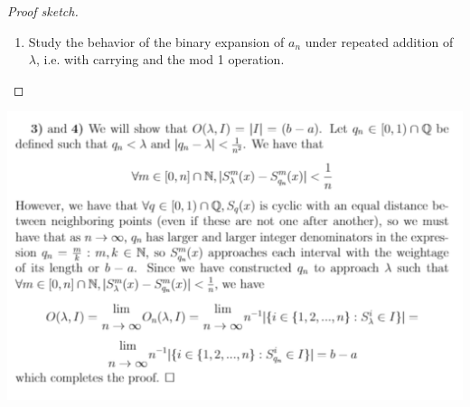 \begin{enumerate}[label=(5.\arabic*)]
\begin{proof}[Proof sketch]
\begin{enumerate}
    \item Study the behavior of the binary expansion of $a_n$ under repeated addition of $\lambda$, i.e. with carrying and the mod 1 operation.
    \end{enumerate}
  \end{proof}

\begin{mdframed}
\includegraphics[width=400pt]{img/analysis--berkeley-202a-hw02-9a70.png}
\end{mdframed}

\end{enumerate}

